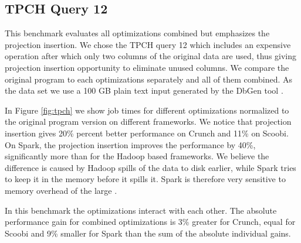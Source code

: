\subsection{TPCH Query 12}
\label{subsec:tpch-query-12}

This benchmark evaluates all optimizations combined but emphasizes the
projection insertion. We chose the TPCH query 12 which includes an expensive
 operation after which only two columns of the original data are
used, thus giving projection insertion opportunity to eliminate unused columns.
We compare the original program to each optimizations separately and all of them
combined. As the data set we use a 100 GB plain text input generated by the
DbGen tool \cite{tpch}.

In Figure \ref{fig:tpch} we show job times for different optimizations
normalized to the original program version on different frameworks. We notice
that projection insertion gives 20\% percent better performance on Crunch and
11\% on Scoobi. On Spark, the projection insertion improves the performance by
40\%, significantly more than for the Hadoop based frameworks. We believe the
difference is caused by Hadoop spills of the data to disk earlier, while Spark
tries to keep it in the memory before it spills it. Spark is therefore very
sensitive to memory overhead of the large .

In this benchmark the optimizations interact with each other. The absolute performance gain for combined optimizations is 3\% greater for Crunch, equal for Scoobi and 9\% smaller for Spark than the sum of the absolute individual gains.

